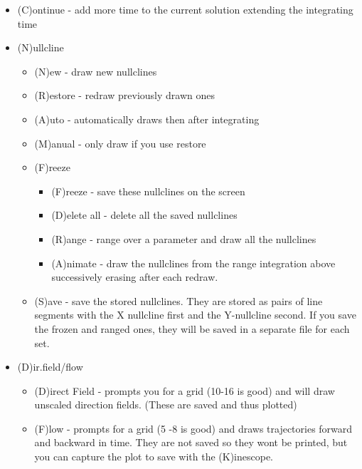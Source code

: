 \documentclass{article}
\begin{document}
\begin{itemize}
\begin{itemize}
\item (D)AE guess - reset the guess for differential algebraic systems 
\item (B)ackward - like (G)o but integrate backward in time
\item (P)eriodic - takes the existing trajectory and tries to get the periodic orbit from it. It then changes Total to the period and phase shifts to the peak of the variable on the time axis or along the x-axis in phase-plane view.
\end{itemize}
\item (C)ontinue - add more time to the current solution extending the integrating time
\item (N)ullcline 
\begin{itemize}
\item (N)ew - draw new nullclines
\item (R)estore - redraw previously drawn ones
\item (A)uto - automatically draws then after integrating
\item (M)anual - only draw if you use restore
\item (F)reeze
\begin{itemize}
\item (F)reeze - save these nullclines on the screen
\item (D)elete all - delete all the saved nullclines
\item (R)ange - range over a parameter and draw all the nullclines
\item (A)nimate - draw the nullclines from the range integration above successively erasing after each redraw.
\end{itemize}
\item (S)ave - save the stored nullclines. They are stored as pairs of line segments with the X nullcline first and the Y-nullcline second. If you save the frozen and ranged ones, they will be saved in a separate file for each set. 
\end{itemize}
\item (D)ir.field/flow 
\begin{itemize}
\item (D)irect Field - prompts you for a grid (10-16 is good) and will draw unscaled direction fields. (These are saved and thus plotted)
\item (F)low - prompts for a grid (5 -8 is good) and draws trajectories forward and backward in time. They are not saved so they wont be printed, but you can capture the plot to save with the (K)inescope.

\end{itemize}
\end{itemize}
\end{document}
